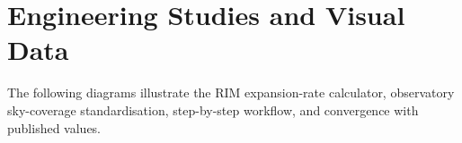 \documentclass[12pt]{article}
\begin{document}
\newpage

\section{Engineering Studies and Visual Data}
The following diagrams illustrate the RIM expansion-rate calculator, observatory sky-coverage standardisation, step-by-step workflow, and convergence with published values.


\end{document}
